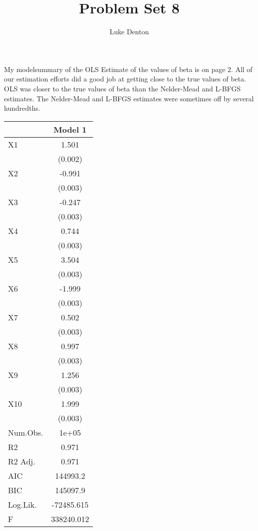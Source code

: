 \documentclass{homework}
\title{Problem Set 8}
\author{Luke Denton}
\begin{document}
\maketitle

\exercise
My modelsummary of the OLS Estimate of the values of beta is on page 2. All of our estimation efforts did a good job at getting close to the true values of beta. OLS was closer to the true values of beta than the Nelder-Mead and L-BFGS estimates. The Nelder-Mead and L-BFGS estimates were sometimes off by several hundredths.

\begin{table}
\centering
\begin{tabular}[t]{lc}
\toprule
  & Model 1\\
\midrule
X1 & 1.501\\
 & (0.002)\\
X2 & -0.991\\
 & \vphantom{8} (0.003)\\
X3 & -0.247\\
 & \vphantom{7} (0.003)\\
X4 & 0.744\\
 & \vphantom{6} (0.003)\\
X5 & 3.504\\
 & \vphantom{5} (0.003)\\
X6 & -1.999\\
 & \vphantom{4} (0.003)\\
X7 & 0.502\\
 & \vphantom{3} (0.003)\\
X8 & 0.997\\
 & \vphantom{2} (0.003)\\
X9 & 1.256\\
 & \vphantom{1} (0.003)\\
X10 & 1.999\\
 & (0.003)\\
\midrule
Num.Obs. & 1e+05\\
R2 & 0.971\\
R2 Adj. & 0.971\\
AIC & 144993.2\\
BIC & 145097.9\\
Log.Lik. & -72485.615\\
F & 338240.012\\
\bottomrule
\end{tabular}
\end{table}
\end{document}
